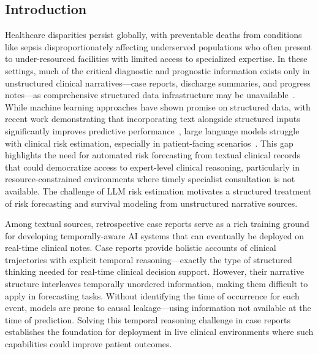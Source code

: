 \subsection{Introduction}

Healthcare disparities persist globally, with preventable deaths from conditions like sepsis disproportionately affecting underserved populations who often present to under-resourced facilities with limited access to specialized expertise.
In these settings, much of the critical diagnostic and prognostic information exists only in unstructured clinical narratives—case reports, discharge summaries, and progress notes—as comprehensive structured data infrastructure may be unavailable~\cite{anzalone2025lower,seinen2025using}.
While machine learning approaches have shown promise on structured data, with recent work demonstrating that incorporating text alongside structured inputs significantly improves predictive performance~\citep{kline2022multimodal}, large language models struggle with clinical risk estimation, especially in patient-facing scenarios~\citep{wongposition}.
This gap highlights the need for automated risk forecasting from textual clinical records that could democratize access to expert-level clinical reasoning, particularly in resource-constrained environments where timely specialist consultation is not available.
The challenge of LLM risk estimation motivates a structured treatment of risk forecasting and survival modeling from unstructured narrative sources.

Among textual sources, retrospective case reports serve as a rich training ground for developing temporally-aware AI systems that can eventually be deployed on real-time clinical notes.
Case reports provide holistic accounts of clinical trajectories with explicit temporal reasoning—exactly the type of structured thinking needed for real-time clinical decision support.
However, their narrative structure interleaves temporally unordered information, making them difficult to apply in forecasting tasks.
Without identifying the time of occurrence for each event, models are prone to causal leakage—using information not available at the time of prediction.
Solving this temporal reasoning challenge in case reports establishes the foundation for deployment in live clinical environments where such capabilities could improve patient outcomes.






